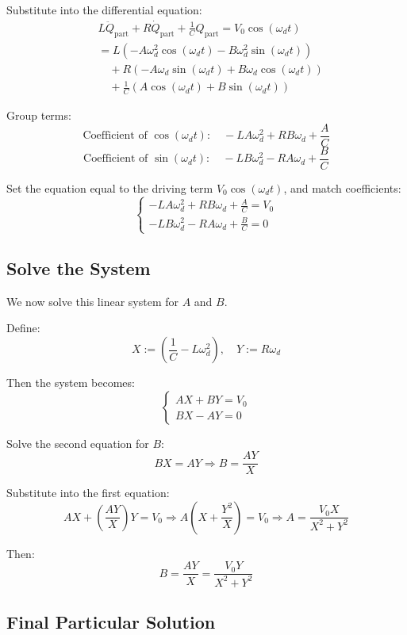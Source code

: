 \documentclass{article}
\begin{document}
Substitute into the differential equation:
\begin{align*}
&L \ddot{Q}_{\text{part}} + R \dot{Q}_{\text{part}} + \frac{1}{C} Q_{\text{part}} = V_0 \cos(\omega_d t) \\
&= L(-A \omega_d^2 \cos(\omega_d t) - B \omega_d^2 \sin(\omega_d t)) \\
&\quad + R(-A \omega_d \sin(\omega_d t) + B \omega_d \cos(\omega_d t)) \\
&\quad + \frac{1}{C}(A \cos(\omega_d t) + B \sin(\omega_d t))
\end{align*}

Group terms:
\[
\text{Coefficient of } \cos(\omega_d t):\quad -L A \omega_d^2 + R B \omega_d + \frac{A}{C}
\]
\[
\text{Coefficient of } \sin(\omega_d t):\quad -L B \omega_d^2 - R A \omega_d + \frac{B}{C}
\]

Set the equation equal to the driving term \( V_0 \cos(\omega_d t) \), and match coefficients:
\[
\begin{cases}
- L A \omega_d^2 + R B \omega_d + \frac{A}{C} = V_0 \\
- L B \omega_d^2 - R A \omega_d + \frac{B}{C} = 0
\end{cases}
\]

\subsection*{Solve the System}

We now solve this linear system for \( A \) and \( B \).

Define:
\[
X := \left( \frac{1}{C} - L \omega_d^2 \right), \quad Y := R \omega_d
\]

Then the system becomes:
\[
\begin{cases}
A X + B Y = V_0 \\
B X - A Y = 0
\end{cases}
\]

Solve the second equation for \( B \):
\[
B X = A Y \Rightarrow B = \frac{A Y}{X}
\]

Substitute into the first equation:
\[
A X + \left( \frac{A Y}{X} \right) Y = V_0
\Rightarrow A \left( X + \frac{Y^2}{X} \right) = V_0
\Rightarrow A = \frac{V_0 X}{X^2 + Y^2}
\]

Then:
\[
B = \frac{A Y}{X} = \frac{V_0 Y}{X^2 + Y^2}
\]

\subsection*{Final Particular Solution}
\end{document}
